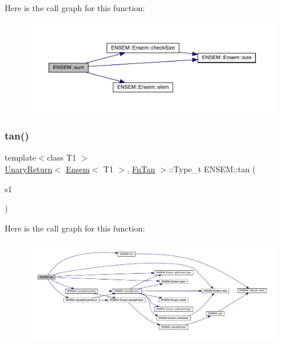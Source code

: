 Here is the call graph for this function\+:\nopagebreak
\begin{figure}[H]
\begin{center}
\leavevmode
\includegraphics[width=350pt]{d1/d9e/group__eensem_gac055c3d3de5296fcc478482fc09633ce_cgraph}
\end{center}
\end{figure}
\mbox{\label{group__eensem_ga56d3def0223da8c49dd2210228349eb0}} 
\subsubsection{\texorpdfstring{tan()}{tan()}}
{\footnotesize\ttfamily template$<$class T1 $>$ \\
\mbox{\hyperlink{structENSEM_1_1UnaryReturn}{Unary\+Return}}$<$ \mbox{\hyperlink{classENSEM_1_1Ensem}{Ensem}}$<$ T1 $>$, \mbox{\hyperlink{structENSEM_1_1FnTan}{Fn\+Tan}} $>$\+::Type\+\_\+t E\+N\+S\+E\+M\+::tan (\begin{DoxyParamCaption}\item[{const \mbox{\hyperlink{classENSEM_1_1Ensem}{Ensem}}$<$ T1 $>$ \&}]{s1 }\end{DoxyParamCaption})\hspace{0.3cm}{\ttfamily [inline]}}

Here is the call graph for this function\+:\nopagebreak
\begin{figure}[H]
\begin{center}
\leavevmode
\includegraphics[width=350pt]{d1/d9e/group__eensem_ga56d3def0223da8c49dd2210228349eb0_cgraph}
\end{center}
\end{figure}
\mbox{\label{group__eensem_ga3fc5873019ba3366e2e3fd6cad8632bd}} 
